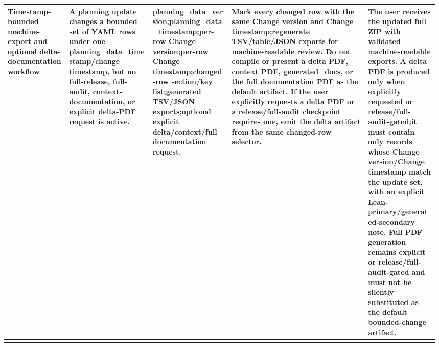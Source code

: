 \begin{longtable}{L{0.14\linewidth} L{0.19\linewidth} L{0.18\linewidth} L{0.31\linewidth} L{0.16\linewidth}}
\hline
\addlinespace[0.24em]
Timestamp-bounded machine-export and optional delta-documentation workflow & A planning update changes a bounded set of YAML rows under one planning\_data\_timestamp/\allowbreak{}change timestamp, but no full-release, full-audit, context-documentation, or explicit delta-PDF request is active. & planning\_data\_version;\newline planning\_data\_timestamp;\newline per-row Change version;\newline per-row Change timestamp;\newline changed-row section/\allowbreak{}key list;\newline generated TSV/\allowbreak{}JSON exports;\newline optional explicit delta/\allowbreak{}context/\allowbreak{}full documentation request. & Mark every changed row with the same Change version and Change timestamp;\newline regenerate TSV/\allowbreak{}table/\allowbreak{}JSON exports for machine-readable review. Do not compile or present a delta PDF, context PDF, generated\_docs, or the full documentation PDF as the default artifact. If the user explicitly requests a delta PDF or a release/\allowbreak{}full-audit checkpoint requires one, emit the delta artifact from the same changed-row selector. & The user receives the updated full ZIP with validated machine-readable exports. A delta PDF is produced only when explicitly requested or release/\allowbreak{}full-audit-gated;\newline it must contain only records whose Change version/\allowbreak{}Change timestamp match the update set, with an explicit Lean-primary/\allowbreak{}generated-secondary note. Full PDF generation remains explicit or release/\allowbreak{}full-audit-gated and must not be silently substituted as the default bounded-change artifact.\\
\hline
\addlinespace[0.24em]

\end{longtable}
